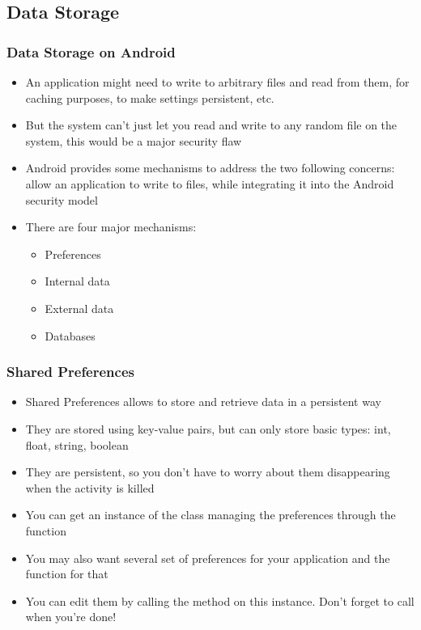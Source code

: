 \subsection{Data Storage}

\begin{frame}
  \frametitle{Data Storage on Android}
  \begin{itemize}
  \item An application might need to write to arbitrary
    files and read from them, for caching purposes, to make settings persistent, etc.
  \item But the system can't just let you read and write to any random
    file on the system, this would be a major security flaw
  \item Android provides some mechanisms to address the two following concerns:
    allow an application to write to files, while integrating it
    into the Android security model
  \item There are four major mechanisms:
    \begin{itemize}
    \item Preferences
    \item Internal data
    \item External data
    \item Databases
    \end{itemize}
  \end{itemize}
\end{frame}

\begin{frame}
  \frametitle{Shared Preferences}
  \begin{itemize}
  \item Shared Preferences allows to store and retrieve data in a
    persistent way
  \item They are stored using key-value pairs, but can only store
    basic types: int, float, string, boolean
  \item They are persistent, so you don't have to worry about them
    disappearing when the activity is killed
  \item You can get an instance of the class managing the preferences
    through the function 
  \item You may also want several set of preferences for your
    application and the function  for that
  \item You can edit them by calling the method  on this
    instance. Don't forget to call  when you're done!
  \end{itemize}
\end{frame}

